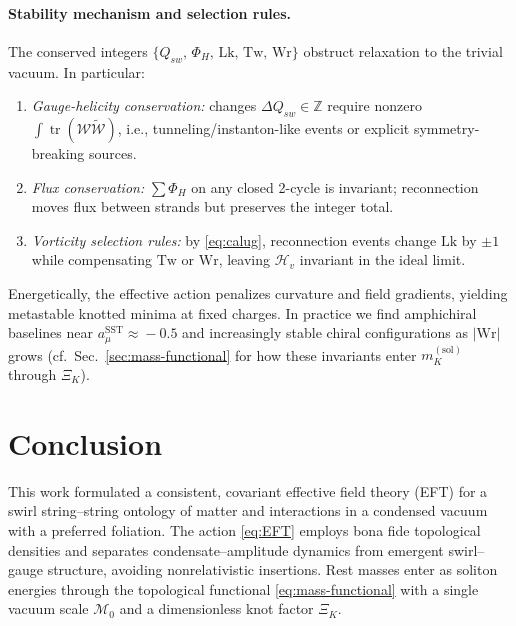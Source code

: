 \documentclass[smallextended]{svjour3}       %
\begin{document}
	\paragraph{Stability mechanism and selection rules.}
	The conserved integers \(\{Q_{\!sw},\,\Phi_H,\,\mathrm{Lk},\,\mathrm{Tw},\,\mathrm{Wr}\}\) obstruct relaxation to the trivial vacuum. In particular:
	\begin{enumerate}
		\item \textit{Gauge-helicity conservation:} changes \(\Delta Q_{\!sw}\in\mathbb{Z}\) require nonzero \(\int \mathop{\mathrm{tr}}(\mathcal{W}\tilde{\mathcal{W}})\), i.e., tunneling/instanton-like events or explicit symmetry-breaking sources.
		\item \textit{Flux conservation:} \(\sum \Phi_H\) on any closed 2-cycle is invariant; reconnection moves flux between strands but preserves the integer total.
		\item \textit{Vorticity selection rules:} by \eqref{eq:calug}, reconnection events change \(\mathrm{Lk}\) by \(\pm1\) while compensating \(\mathrm{Tw}\) or \(\mathrm{Wr}\), leaving \(\mathcal{H}_{\!v}\) invariant in the ideal limit.
	\end{enumerate}
	Energetically, the effective action penalizes curvature and field gradients, yielding metastable knotted minima at fixed charges. In practice we find amphichiral baselines near \(a_\mu^{\mathrm{SST}}\!\approx\!-0.5\) and increasingly stable chiral configurations as \(|\mathrm{Wr}|\) grows (cf.\ Sec.~\ref{sec:mass-functional} for how these invariants enter \(m_K^{(\mathrm{sol})}\) through \(\Xi_K\)).


    \section{Conclusion}

    This work formulated a consistent, covariant effective field theory (EFT) for a swirl string–string ontology of matter and interactions in a condensed vacuum with a preferred foliation. The action \eqref{eq:EFT} employs bona fide topological densities and separates condensate–amplitude dynamics from emergent swirl–gauge structure, avoiding nonrelativistic insertions. Rest masses enter as soliton energies through the topological functional \eqref{eq:mass-functional} with a single vacuum scale \(\mathcal{M}_0\) and a dimensionless knot factor \(\Xi_K\).
\end{document}
